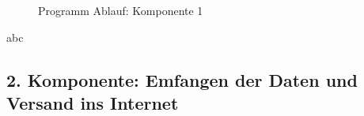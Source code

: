 \begin{center}
	\begin{figure}[h]
	 
	 \noindent{}
	 \caption[PAP komponente 1]{Programm Ablauf: Komponente 1}
	 \label{fig:lorasendsensorread}
	\end{figure}
\end{center}


abc

\newpage

\subsection{2. Komponente: Emfangen der Daten und Versand ins Internet} \label{Empfänger}

